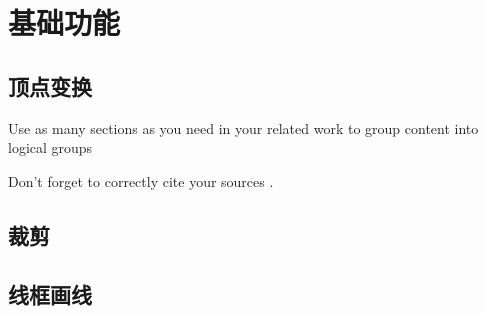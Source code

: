 

    \chapter{基础功能}

    \section{顶点变换}
    Use as many sections as you need in your related work to group content into logical groups

    Don't forget to correctly cite your sources \cite{art1}.
    \section{裁剪}
    \section{线框画线}

